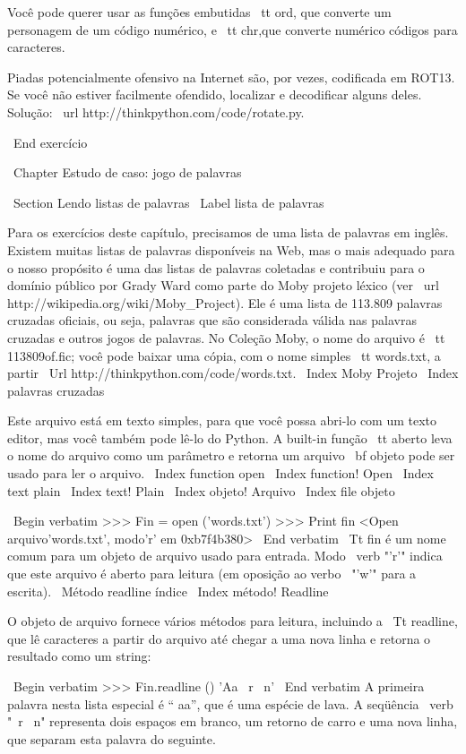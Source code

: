 \documentclass[10pt]{book}
\begin{document}
\begin {itemize}
{{{{{{Você pode querer usar as funções embutidas {\ tt ord}, ​​que converte
um personagem de um código numérico, e {\ tt chr}, ​​que converte numérico
códigos para caracteres.

Piadas potencialmente ofensivo na Internet são, por vezes, codificada
em ROT13. Se você não estiver facilmente ofendido, localizar e decodificar alguns
deles. Solução: \ url {http://thinkpython.com/code/rotate.py}.

\ End {} exercício


\ Chapter {Estudo de caso: jogo de palavras}

\ Section {Lendo listas de palavras}
\ Label {lista de palavras}

Para os exercícios deste capítulo, precisamos de uma lista de palavras em inglês.
Existem muitas listas de palavras disponíveis na Web, mas o mais
adequado para o nosso propósito é uma das listas de palavras coletadas e
contribuiu para o domínio público por Grady Ward como parte do Moby
projeto léxico (ver \ url {http://wikipedia.org/wiki/Moby_Project}). Ele
é uma lista de 113.809 palavras cruzadas oficiais, ou seja, palavras que são
considerada válida nas palavras cruzadas e outros jogos de palavras. No
Coleção Moby, o nome do arquivo é {\ tt 113809of.fic}; você pode baixar
uma cópia, com o nome simples {\ tt words.txt}, a partir
\ Url {http://thinkpython.com/code/words.txt}.
\ Index {Moby Projeto}
\ Index {} palavras cruzadas

Este arquivo está em texto simples, para que você possa abri-lo com um texto
editor, mas você também pode lê-lo do Python. A built-in
função {\ tt aberto} leva o nome do arquivo como um parâmetro
e retorna um arquivo {\ bf objeto} pode ser usado para ler o arquivo.
\ Index {function open}
\ Index {function! Open}
\ Index {text plain}
\ Index {text! Plain}
\ Index {objeto! Arquivo}
\ Index {file objeto}

\ Begin {verbatim}
>>> Fin = open ('words.txt')
>>> Print fin
<Open arquivo'words.txt', modo'r' em 0xb7f4b380>
\ End {verbatim}
%
{\ Tt fin} é um nome comum para um objeto de arquivo usado para
entrada. Modo \ verb "'r'" indica que este arquivo é aberto para
leitura (em oposição ao verbo \ "'w'" para a escrita).
\ {Método readline} índice
\ Index {método! Readline}

O objeto de arquivo fornece vários métodos para leitura, incluindo a
{\ Tt readline}, que lê caracteres a partir do arquivo
até chegar a uma nova linha e retorna o resultado como um
string:

\ Begin {verbatim}
>>> Fin.readline ()
'Aa \ r \ n'
\ End {verbatim}
%
A primeira palavra nesta lista especial é `` aa'', que é uma espécie de
lava. A seqüência \ verb "\ r \ n" representa dois espaços em branco,
um retorno de carro e uma nova linha, que separam esta palavra do
seguinte.

}}}}}}
\end{itemize}
\end{document}
